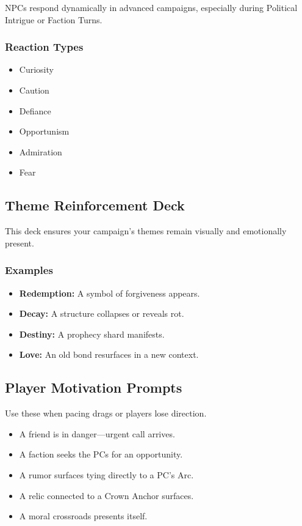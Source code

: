 \documentclass[11pt]{article}
\begin{document}
NPCs respond dynamically in advanced campaigns, especially during Political Intrigue or 
Faction Turns.

\subsubsection{Reaction Types}
\begin{itemize}
    \item Curiosity
    \item Caution
    \item Defiance
    \item Opportunism
    \item Admiration
    \item Fear
\end{itemize}

\subsection{Theme Reinforcement Deck}

This deck ensures your campaign's themes remain visually and emotionally present.

\subsubsection{Examples}
\begin{itemize}
    \item \textbf{Redemption:} A symbol of forgiveness appears.
    \item \textbf{Decay:} A structure collapses or reveals rot.
    \item \textbf{Destiny:} A prophecy shard manifests.
    \item \textbf{Love:} An old bond resurfaces in a new context.
\end{itemize}

\subsection{Player Motivation Prompts}

Use these when pacing drags or players lose direction.

\begin{itemize}
    \item A friend is in danger---urgent call arrives.
    \item A faction seeks the PCs for an opportunity.
    \item A rumor surfaces tying directly to a PC's Arc.
    \item A relic connected to a Crown Anchor surfaces.
    \item A moral crossroads presents itself.
\end{itemize}
\end{document}
